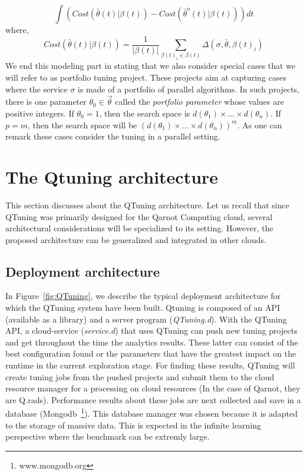 \documentclass[10pt, conference, compsocconf]{IEEEtran}
\begin{document}
\[
\int \left( Cost(\bar{\theta}(t)| \beta(t)) - Cost(\bar{\theta}^o(t) | \beta(t)) \right) dt
\]
where, 
\[
Cost(\bar{\theta}(t) | \beta(t)) = \frac{1}{|\beta(t)|}\sum_{\beta(t)_i \in \beta(t)} \Delta(\sigma, \bar{\theta}, \beta(t)_i) 
\]
We end this modeling part in stating that we also consider special cases that we will refer to as portfolio tuning project. 
These projects aim at capturing cases where the service $\sigma$ is made of a portfolio of parallel algorithms. 
In such projects, there is one parameter $\theta_0 \in \vec{\theta}$ called the {\it portfolio parameter} whose values are positive 
integers. If $\theta_0 = 1$, then the search space is $d(\theta_1) \times \dots  \times d(\theta_n)$. If $p = m$, then the search 
space will be $(d(\theta_1) \times \dots  \times d(\theta_n))^m$. As one can remark these cases consider the tuning in 
a parallel setting. 


\section{The Qtuning architecture} \label{Architecture}

This section discusses about the QTuning architecture. Let us recall that since QTuning was primarily designed 
for the Qarnot Computing cloud, several architectural considerations will be specialized to its setting. However, 
the proposed architecture can be generalized and integrated in other clouds.

\subsection{Deployment architecture}

	\begin{figure*}[hbtp]
	\begin{center}
	
	\caption{In-situ computing with QTuning}
	\label{fig:QTuning}
	\end{center}
	\end{figure*}

In Figure~\ref{fig:QTuning}, we describe the typical deployment architecture for which the 
QTuning system have been built. Qtuning is composed of an API (available as a library) and 
a server program ({\it QTuning.d}). With the QTuning API, a cloud-service ({\it service.d}) that uses QTuning can 
push new tuning projects and get throughout the time the analytics results. These latter can consist of 
the best configuration found or the parameters that have the greatest impact on the runtime in the 
current exploration stage. For finding these results, QTuning will create tuning jobs from the pushed projects 
and submit them to the cloud resource manager for a processing on cloud resources (In the case of Qarnot, they are Q.rads). 
Performance results about these jobs are next collected and save in a database (Mongodb~\footnote{www.mongodb.org}). This  
database manager was chosen because it is adapted to the storage of massive data. This is expected in the infinite learning 
perspective where the benchmark can be extremly large.
\end{document}
